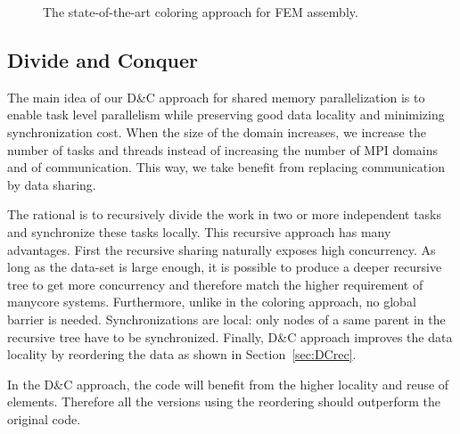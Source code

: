\documentclass[10pt]{IOS-Book-Article}
\begin{document}
\begin{figure}[htp]
\caption{The state-of-the-art coloring approach for FEM assembly.}
\label{fig:colApp}
\end{figure}

\subsection{Divide and Conquer}
\label{sec:dc}

The main idea of our D\&C approach for shared memory parallelization is to enable task level parallelism while preserving good data locality and minimizing synchronization cost.
When the size of the domain increases, we increase the number of tasks and threads instead of increasing the number of MPI domains and of communication.
This way, we take benefit from replacing communication by data sharing.

The rational is to recursively divide the work in two or more independent tasks and synchronize these tasks locally.
This recursive approach has many advantages.
First the recursive sharing naturally exposes high concurrency.
As long as the data-set is large enough, it is possible to produce a deeper recursive tree to get more concurrency and therefore match the higher requirement of manycore systems.
Furthermore, unlike in the coloring approach, no global barrier is needed.
Synchronizations are local: only nodes of a same parent in the recursive tree have to be synchronized.
Finally, D\&C approach improves the data locality by reordering the data as shown in Section~\ref{sec:DCrec}.

In the D\&C approach, the code will benefit from the higher locality and reuse of elements.
Therefore all the versions using the reordering should outperform the original code.
\end{document}

